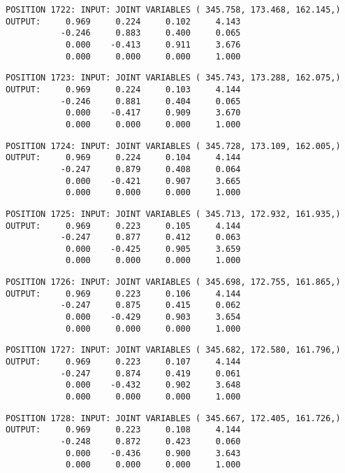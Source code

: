 \begin{verbatim}
POSITION 1722: INPUT: JOINT VARIABLES ( 345.758, 173.468, 162.145,)
OUTPUT:     0.969     0.224     0.102     4.143
           -0.246     0.883     0.400     0.065
            0.000    -0.413     0.911     3.676
            0.000     0.000     0.000     1.000
\end{verbatim} \pagebreak[1]\begin{verbatim}
POSITION 1723: INPUT: JOINT VARIABLES ( 345.743, 173.288, 162.075,)
OUTPUT:     0.969     0.224     0.103     4.144
           -0.246     0.881     0.404     0.065
            0.000    -0.417     0.909     3.670
            0.000     0.000     0.000     1.000
\end{verbatim} \pagebreak[1]\begin{verbatim}
POSITION 1724: INPUT: JOINT VARIABLES ( 345.728, 173.109, 162.005,)
OUTPUT:     0.969     0.224     0.104     4.144
           -0.247     0.879     0.408     0.064
            0.000    -0.421     0.907     3.665
            0.000     0.000     0.000     1.000
\end{verbatim} \pagebreak[1]\begin{verbatim}
POSITION 1725: INPUT: JOINT VARIABLES ( 345.713, 172.932, 161.935,)
OUTPUT:     0.969     0.223     0.105     4.144
           -0.247     0.877     0.412     0.063
            0.000    -0.425     0.905     3.659
            0.000     0.000     0.000     1.000
\end{verbatim} \pagebreak[1]\begin{verbatim}
POSITION 1726: INPUT: JOINT VARIABLES ( 345.698, 172.755, 161.865,)
OUTPUT:     0.969     0.223     0.106     4.144
           -0.247     0.875     0.415     0.062
            0.000    -0.429     0.903     3.654
            0.000     0.000     0.000     1.000
\end{verbatim} \pagebreak[1]\begin{verbatim}
POSITION 1727: INPUT: JOINT VARIABLES ( 345.682, 172.580, 161.796,)
OUTPUT:     0.969     0.223     0.107     4.144
           -0.247     0.874     0.419     0.061
            0.000    -0.432     0.902     3.648
            0.000     0.000     0.000     1.000
\end{verbatim} \pagebreak[1]\begin{verbatim}
POSITION 1728: INPUT: JOINT VARIABLES ( 345.667, 172.405, 161.726,)
OUTPUT:     0.969     0.223     0.108     4.144
           -0.248     0.872     0.423     0.060
            0.000    -0.436     0.900     3.643
            0.000     0.000     0.000     1.000
\end{verbatim} \pagebreak[1]\begin{verbatim}

\end{verbatim}
